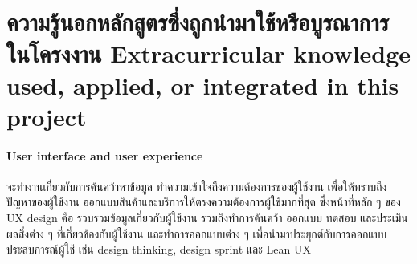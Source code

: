 \section{\ifcpe%
ความรู้นอกหลักสูตรซึ่งถูกนำมาใช้หรือบูรณาการในโครงงาน
\else%
Extracurricular knowledge used, applied, or integrated in this project
\fi
}
\paragraph{User interface and user experience}
จะทำงานเกี่ยวกับการค้นคว้าหาข้อมูล ทำความเข้าใจถึงความต้องการของผู้ใช้งาน เพื่อให้ทราบถึงปัญหาของผู้ใช้งาน
ออกแบบสินค้าและบริการให้ตรงความต้องการผู้ใช้มากที่สุด ซึ่งหน้าที่หลัก ๆ ของ UX design คือ 
รวบรวมข้อมูลเกี่ยวกับผู้ใช้งาน รวมถึงทำการค้นคว้า ออกแบบ ทดสอบ และประเมินผลสิ่งต่าง ๆ 
ที่เกี่ยวข้องกับผู้ใช้งาน และทำการออกแบบต่าง ๆ เพื่อนำมาประยุกต์กับการออกแบบประสบการณ์ผู้ใช้
 เช่น design thinking, design sprint และ Lean UX

